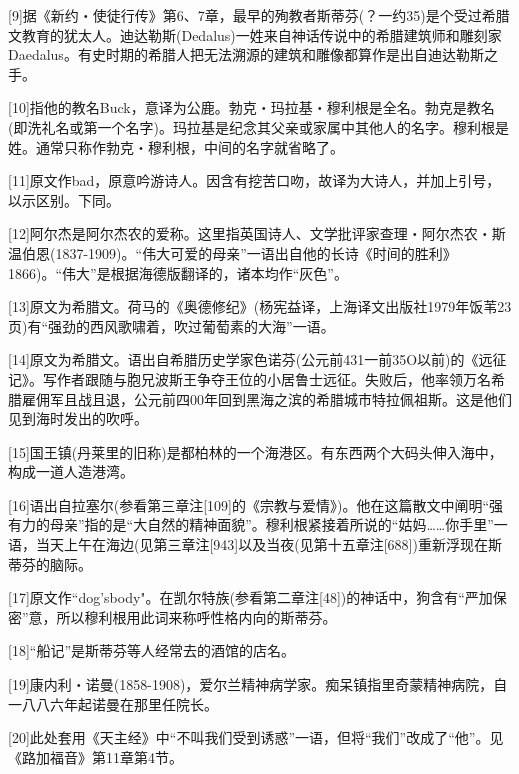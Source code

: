 \documentclass{article}
\begin{document}
[9]据《新约・使徒行传》第6、7章，最早的殉教者斯蒂芬(？一约35)是个受过希腊文教育的犹太人。迪达勒斯(Dedalus)一姓来自神话传说中的希腊建筑师和雕刻家Daedalus。有史时期的希腊人把无法溯源的建筑和雕像都算作是出自迪达勒斯之手。



[10]指他的教名Buck，意译为公鹿。勃克・玛拉基・穆利根是全名。勃克是教名(即洗礼名或第一个名字)。玛拉基是纪念其父亲或家属中其他人的名字。穆利根是姓。通常只称作勃克・穆利根，中间的名字就省略了。



[11]原文作bad，原意吟游诗人。因含有挖苦口吻，故译为大诗人，并加上引号，以示区别。下同。



[12]阿尔杰是阿尔杰农的爱称。这里指英国诗人、文学批评家查理・阿尔杰农・斯温伯恩(1837-1909)。“伟大可爱的母亲”一语出自他的长诗《时间的胜利》1866)。“伟大”是根据海德版翻译的，诸本均作“灰色”。



[13]原文为希腊文。荷马的《奥德修纪》(杨宪益译，上海译文出版社1979年饭苇23页)有“强劲的西风歌啸着，吹过葡萄素的大海”一语。



[14]原文为希腊文。语出自希腊历史学家色诺芬(公元前431一前35O以前)的《远征记》。写作者跟随与胞兄波斯王争夺王位的小居鲁士远征。失败后，他率领万名希腊雇佣军且战且退，公元前四00年回到黑海之滨的希腊城市特拉佩祖斯。这是他们见到海时发出的吹呼。



[15]国王镇(丹莱里的旧称)是都柏林的一个海港区。有东西两个大码头伸入海中，构成一道人造港湾。



[16]语出自拉塞尔(参看第三章注[109]的《宗教与爱情》)。他在这篇散文中阐明“强有力的母亲”指的是“大自然的精神面貌”。穆利根紧接着所说的“姑妈……你手里”一语，当天上午在海边(见第三章注[943]以及当夜(见第十五章注[688])重新浮现在斯蒂芬的脑际。



[17]原文作“dog'sbody"。在凯尔特族(参看第二章注[48])的神话中，狗含有“严加保密”意，所以穆利根用此词来称呼性格内向的斯蒂芬。



[18]“船记”是斯蒂芬等人经常去的酒馆的店名。



[19]康内利・诺曼(1858-1908)，爱尔兰精神病学家。痴呆镇指里奇蒙精神病院，自一八八六年起诺曼在那里任院长。



[20]此处套用《天主经》中“不叫我们受到诱惑”一语，但将“我们”改成了“他”。见《路加福音》第11章第4节。
\end{document}
